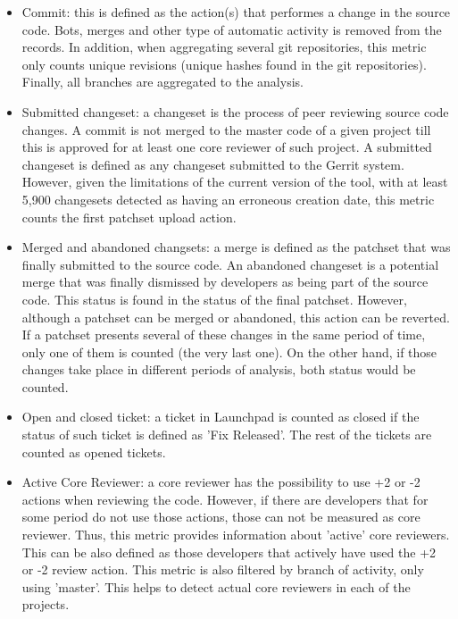 \documentclass[a4wide,11pt]{report}
\begin{document}
\begin{itemize}
\item Commit: this is defined as the action(s) that performes a change in the source code. 
Bots, merges and other type of automatic activity is removed from the records. In addition,
when aggregating several git repositories, this metric only counts unique revisions (unique hashes found in the git repositories).
Finally, all branches are aggregated to the analysis.

\item Submitted changeset: a changeset is the process of peer reviewing source code changes. A commit
is not merged to the master code of a given project till this is approved for at least one core
reviewer of such project. A submitted changeset is defined as any changeset submitted to the Gerrit
system. However, given the limitations of the current version of the tool, with at least 5,900 changesets
detected as having an erroneous creation date, this metric counts the first patchset upload action. 
 
\item Merged and abandoned changsets: a merge is defined as the patchset that was finally submitted to the 
source code. An abandoned changeset is a potential merge that was finally dismissed by developers as
being part of the source code. This status is found in the status of the final patchset. However, although
a patchset can be merged or abandoned, this action can be reverted. If a patchset presents several of 
these changes in the same period of time, only one of them is counted (the very last one). On the other hand,
if those changes take place in different periods of analysis, both status would be counted.

\item Open and closed ticket: a ticket in Launchpad is counted as closed if the status of such ticket is defined as 'Fix Released'.
The rest of the tickets are counted as opened tickets.

\item Active Core Reviewer: a core reviewer has the possibility to use +2 or -2 actions when reviewing the code. 
However, if there are developers that for some period do not use those actions, those can not be measured as core reviewer.
Thus, this metric provides information about 'active' core reviewers. This can be also defined as those developers
that actively have used the +2 or -2 review action. This metric is also filtered by branch of activity, only using 'master'.
This helps to detect actual core reviewers in each of the projects.


\end{itemize}
\end{document}
